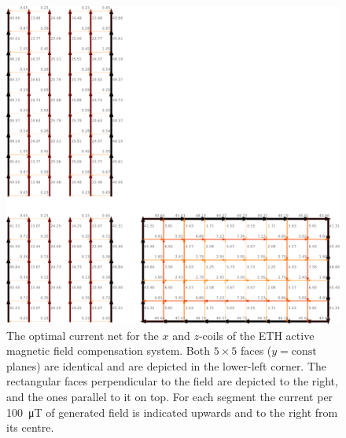 \begin{figure}
  \centering
  \includegraphics[width=0.9\linewidth]{gfx/prototype/coil_design_x_100uT.pdf}
  \caption{The optimal current net for the $x$ and $z$-coils of the ETH active magnetic field compensation system. Both $5 \times 5$ faces ($y = \mathrm{const}$ planes) are identical and are depicted in the lower-left corner. The rectangular faces perpendicular to the field are depicted to the right, and the ones parallel to it on top. For each segment the current per \SI{100}{\micro\tesla} of generated field is indicated upwards and to the right from its centre.}
  \label{fig:prototype_coil_x_z_currents}
\end{figure}





